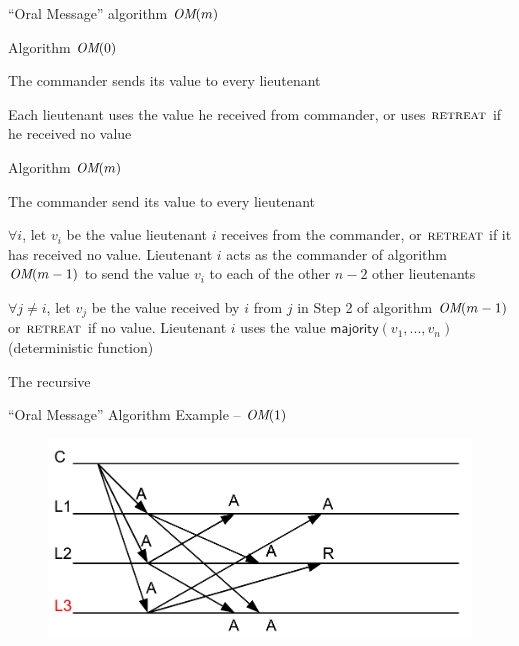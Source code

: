 \begin{frame}{“Oral Message” algorithm $\textit{OM}(m)$}

\BIL
\item Algorithm $\textit{OM}(0)$
	\BE
	\item The commander sends its value to every lieutenant
	\item Each lieutenant uses the value he received from commander, or uses $\textsc{retreat}$ if he received no value
	\EE
\item Algorithm $\textit{OM}(m)$
	\BE
	\item The commander send its value to every lieutenant
	\item $\forall i$, let $v_i$ be the value lieutenant $i$ receives from the
	commander, or $\textsc{retreat}$ if it has received no value. Lieutenant $i$ acts as the
	commander of algorithm $\textit{OM}(m-1)$ to send the value $v_i$ to each of the other $n-2$
	other lieutenants
	\item $\forall j \neq i$, let $v_j$ be the value received by $i$ from $j$
	in Step 2 of algorithm $\textit{OM}(m-1)$ or $\textsc{retreat}$ if no value. Lieutenant $i$ uses
	the value $\mathsf{majority}(v_1, ..., v_n)$ (deterministic function)
	\EE
\EIL

The recursive
\end{frame}

\begin{frame}{“Oral Message” Algorithm Example -- $\textit{OM}(1)$}
	
\begin{figure}	
	\includegraphics[width=\textwidth]{oral}
\end{figure}
	
\end{frame}



